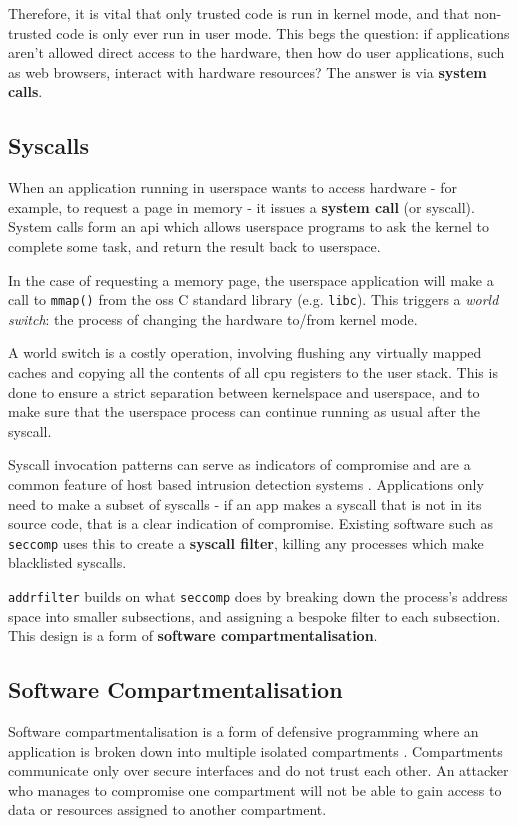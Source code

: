 Therefore, it is vital that only trusted code is run in kernel mode, and that
non-trusted code is only ever run in user mode. This begs the question: if
applications aren't allowed direct access to the hardware, then how do user
applications, such as web browsers, interact with hardware resources? The answer
is via \textbf{system calls}.


\subsection{Syscalls}

When an application running in userspace wants to access hardware - for example,
to request a page in memory - it issues a \textbf{system call} (or syscall). System calls
form an \ac{api} which allows userspace programs to ask the kernel to complete some
task, and return the result back to userspace.

In the case of requesting a memory page, the userspace application will make a
call to \texttt{mmap()} from the \acp{os} C standard library (e.g. \texttt{libc}).
This triggers a \textit{world switch}: the process of changing the hardware
to/from kernel mode.

A world switch is a costly operation, involving flushing any virtually mapped
caches and copying all the contents of all \ac{cpu} registers to the user stack. This
is done to ensure a strict separation between kernelspace and userspace, and to
make sure that the userspace process can continue running as usual after the
syscall.

Syscall invocation patterns can serve as indicators of compromise
and are a common feature of host based intrusion detection systems \cite{10.1145/3214304}. 
Applications only need to make a subset of syscalls
- if an app makes a syscall that is not in its source code, that is a clear
indication of compromise. Existing software such as \texttt{seccomp} uses this
to create a \textbf{syscall filter}, killing any processes which make
blacklisted syscalls. 

\texttt{addrfilter} builds on what \texttt{seccomp} does by breaking down the
process's address space into smaller subsections, and assigning a bespoke filter
to each subsection. This design is a form of \textbf{software
compartmentalisation}. 

\subsection{Software Compartmentalisation}
Software compartmentalisation is a form of defensive programming where an
application is broken down into multiple isolated compartments \cite{SOK}. Compartments
communicate only over secure interfaces and do not trust each other. An attacker
who manages to compromise one compartment will not be able to gain access to
data or resources assigned to another compartment. 

